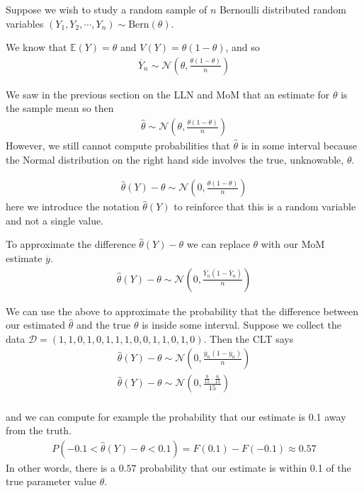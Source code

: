 \begin{VT1}

Suppose we wish to study a random sample of $n$ Bernoulli distributed random variables $(Y_{1},Y_{2},\cdots,Y_{n}) \sim \text{Bern}(\theta)$.

We know that $\mathbb{E}(Y) = \theta$ and $V(Y) = \theta(1-\theta)$, and so 
\begin{align}
    \overline{Y}_{n} \sim \mathcal{N}\left(\theta, \frac{\theta (1-\theta)}{n} \right)
\end{align}

We saw in the previous section on the LLN and MoM that an estimate for $\theta$ is the sample mean so then 
\begin{align}
    \hat{\theta} \sim \mathcal{N}\left(\theta, \frac{\theta (1-\theta)}{n} \right)
\end{align}
However, we still cannot compute probabilities that $\hat{\theta}$ is in some interval because the Normal distribution on the right hand side involves the true, unknowable, $\theta$.

\begin{align}
    \hat{\theta}(Y) - \theta \sim \mathcal{N}\left(0, \frac{\theta (1-\theta)}{n} \right)
\end{align}
here we introduce the notation $\hat{\theta}(Y)$ to reinforce that this is a random variable and not a single value.

To approximate the difference $\hat{\theta}(Y) - \theta$ we can replace $\theta$ with our MoM estimate $\overline{y}$.
\begin{align}
    \hat{\theta}(Y) - \theta \sim \mathcal{N}\left(0, \frac{\overline{Y}_{n} (1-\overline{Y}_{n})}{n} \right)
\end{align}

We can use the above to approximate the probability that the difference between our estimated $\hat{\theta}$ and the true $\theta$ is inside some interval. 
Suppose we collect the data $\mathcal{D} = (1,1,0,1,0,1,1,1,0,0,1,1,0,1,0)$.
Then the CLT says 
\begin{align}
    \hat{\theta}(Y) - \theta \sim \mathcal{N}\left(0, \frac{\overline{y}_{n} (1-\overline{y}_{n})}{n} \right) \\ 
    \hat{\theta}(Y) - \theta \sim \mathcal{N}\left(0, \frac{ \frac{9}{15}  \cdot \frac{6}{15}} {15} \right) \\ 
\end{align}

and we can compute for example the probability that our estimate is 0.1 away from the truth. 
\begin{align}
    P( -0.1 <   \hat{\theta}(Y) - \theta < 0.1) = F(0.1) - F(-0.1) \approx 0.57
\end{align}
In other words, there is a $0.57$ probability that our estimate is within 0.1 of the true parameter value $\theta$.

\end{VT1}

